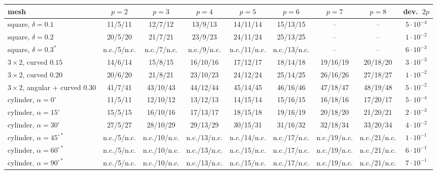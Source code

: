 \begin{tabular}{@{}lcccccccc@{}}
\toprule
mesh & $p=2$ & $p=3$ & $p=4$ & $p=5$ & $p=6$ & $p=7$ & $p=8$ & dev.\ $2p$\\
\midrule
square, $\delta=0.1$ & 11/5/11 & 12/7/12 & 13/9/13 & 14/11/14 & 15/13/15 & -- & -- & $5{\cdot}10^{-4}$\\
square, $\delta=0.2$ & 20/5/20 & 21/7/21 & 23/9/23 & 24/11/24 & 25/13/25 & -- & -- & $1{\cdot}10^{-2}$\\
square, $\delta=0.3^\ast$ & n.c./5/n.c. & n.c./7/n.c. & n.c./9/n.c. & n.c./11/n.c. & n.c./13/n.c. & -- & -- & $6{\cdot}10^{-3}$\\
$3\times2$, curved $0.15$ & 14/6/14 & 15/8/15 & 16/10/16 & 17/12/17 & 18/14/18 & 19/16/19 & 20/18/20 & $3{\cdot}10^{-3}$\\
$3\times2$, curved $0.20$ & 20/6/20 & 21/8/21 & 23/10/23 & 24/12/24 & 25/14/25 & 26/16/26 & 27/18/27 & $1{\cdot}10^{-2}$\\
$3\times2$, angular + curved $0.30$ & 41/7/41 & 43/10/43 & 44/12/44 & 45/14/45 & 46/16/46 & 47/18/47 & 48/19/48 & $5{\cdot}10^{-2}$\\
cylinder, $\alpha=0^{\circ}$ & 11/5/11 & 12/10/12 & 13/12/13 & 14/15/14 & 15/16/15 & 16/18/16 & 17/20/17 & $5{\cdot}10^{-4}$\\
cylinder, $\alpha=15^{\circ}$ & 15/5/15 & 16/10/16 & 17/13/17 & 18/15/18 & 19/16/19 & 20/18/20 & 21/20/21 & $2{\cdot}10^{-3}$\\
cylinder, $\alpha=30^{\circ}$ & 27/5/27 & 28/10/29 & 29/13/29 & 30/15/31 & 31/16/32 & 32/18/34 & 33/20/34 & $4{\cdot}10^{-2}$\\
cylinder, $\alpha=45^{\circ\ast}$ & n.c./5/n.c. & n.c./10/n.c. & n.c./13/n.c. & n.c./14/n.c. & n.c./17/n.c. & n.c./19/n.c. & n.c./21/n.c. & $1{\cdot}10^{-1}$\\
cylinder, $\alpha=60^{\circ\ast}$ & n.c./5/n.c. & n.c./10/n.c. & n.c./13/n.c. & n.c./15/n.c. & n.c./17/n.c. & n.c./19/n.c. & n.c./21/n.c. & $6{\cdot}10^{-1}$\\
cylinder, $\alpha=90^{\circ\ast}$ & n.c./5/n.c. & n.c./10/n.c. & n.c./13/n.c. & n.c./15/n.c. & n.c./17/n.c. & n.c./19/n.c. & n.c./21/n.c. & $7{\cdot}10^{-1}$\\
\bottomrule
\end{tabular}
